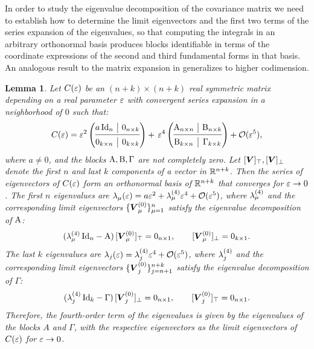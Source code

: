 \documentclass[letterpaper, reqno, 11pt]{amsart}
\newtheorem{lemma}[theorem]{Lemma}
\theoremstyle{definition}
\theoremstyle{remark}
\numberwithin{equation}{section}
\begin{document}
In order to study the eigenvalue decomposition of the covariance matrix we need to establish how to determine the limit eigenvectors and the first two terms of the series expansion of the eigenvalues, so that computing the integrals in an arbitrary orthonormal basis produces blocks identifiable in terms of the coordinate expressions of the second and third fundamental forms in that basis. An analogous result to the matrix expansion in \cite{alvarez2018a} generalizes to higher codimension.

\begin{lemma}\label{lem:matrix}
Let $C(\varepsilon)$ be an $(n+k)\times(n+k)$ real symmetric matrix depending on a real parameter $\varepsilon$ with convergent series expansion in a neighborhood of $0$ such that:
$$
C(\vep) = \vep^2
\left( \begin{array}{@{}c|c@{}}
   \begin{matrix}
		a\,\Id_{n}
   \end{matrix} 
      & 0_{n\times k} \\
   \cmidrule[0.4pt]{1-2}
   0_{k\times n} & 0_{k\times k}  \\
\end{array}  \right)
	+\,\vep^4
\left( \begin{array}{@{}c|c@{}}
   \begin{matrix}
       \mr{A}_{n\times n}
   \end{matrix} 
      & \mr{B}_{n\times k} \\
   \cmidrule[0.4pt]{1-2}
   \mr{B}_{k\times n} & \Gamma_{k\times k}  \\
\end{array} \right) + \cO(\vep^{5}),
$$
where $a\neq 0$, and the blocks $\mathrm{A,B},\Gamma$ are not completely zero. Let $[\boldsymbol{V}]_\top, [\boldsymbol{V}]_\perp$ denote the first $n$ and last $k$ components of a vector in ${\mathbb R}^{n+k}$. Then the series of eigenvectors of $C(\varepsilon)$ form an orthonormal basis of ${\mathbb R}^{n+k}$ that converges for $\varepsilon\rightarrow 0$. The first $n$ eigenvalues are $\lambda_\mu(\varepsilon)=a\varepsilon^2+\lambda^{(4)}_\mu\varepsilon^4+{\mathcal O}(\varepsilon^5)$, where $\lambda^{(4)}_\mu$ and the corresponding limit eigenvectors $\{\boldsymbol{V}^{(0)}_\mu\}_{\mu=1}^n$ satisfy the eigenvalue decomposition of $\mathrm{A}$:
$$
(\lambda^{(4)}_\mu\,\mathrm{Id}_n -\mathrm{A})\, [\boldsymbol{V}^{(0)}_\mu]_\top = 0_{n\times 1},\qquad [\boldsymbol{V}^{(0)}_\mu]_\perp = 0_{k\times 1}. 
$$
The last $k$ eigenvalues are $\lambda_j(\varepsilon)=\lambda^{(4)}_j\varepsilon^4+{\mathcal O}(\varepsilon^5)$, where $\lambda^{(4)}_j$ and the corresponding limit eigenvectors $\{\boldsymbol{V}^{(0)}_j\}_{j=n+1}^{n+k}$ satisfy the eigenvalue decomposition of $\Gamma$:
$$
(\lambda^{(4)}_j\,\mathrm{Id}_k -\Gamma)\, [\boldsymbol{V}^{(0)}_j]_\perp = 0_{n\times 1},\qquad [\boldsymbol{V}^{(0)}_j]_\top = 0_{n\times 1}. 
$$
Therefore, the fourth-order term of the eigenvalues is given by the eigenvalues of the blocks $A$ and $\Gamma$, with the respective eigenvectors as the limit eigenvectors of $C(\varepsilon)$ for $\varepsilon\rightarrow 0$.
\end{lemma}
\end{document}
